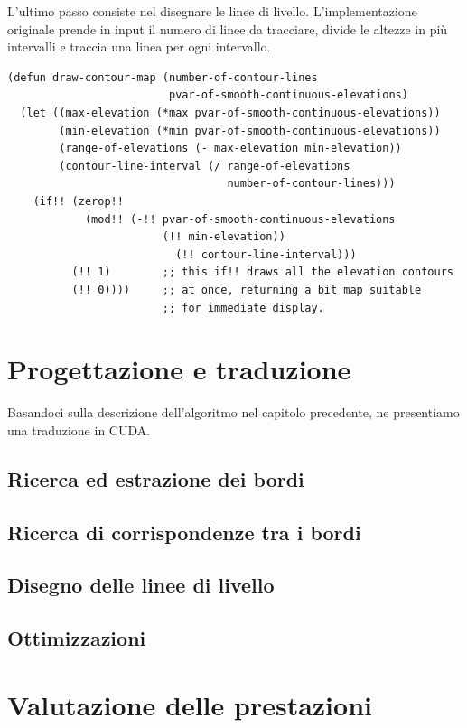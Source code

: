 \documentclass[12pt,a4paper,openright,twoside]{report}
\begin{document}
L'ultimo passo consiste nel disegnare le linee di livello. L'implementazione originale prende in input il numero di linee da tracciare, divide le altezze in più intervalli e traccia una linea per ogni intervallo.

\begin{lstlisting}[style=mystyle]
(defun draw-contour-map (number-of-contour-lines
                         pvar-of-smooth-continuous-elevations)
  (let ((max-elevation (*max pvar-of-smooth-continuous-elevations))
        (min-elevation (*min pvar-of-smooth-continuous-elevations))
        (range-of-elevations (- max-elevation min-elevation))
        (contour-line-interval (/ range-of-elevations
                                  number-of-contour-lines)))
    (if!! (zerop!!
            (mod!! (-!! pvar-of-smooth-continuous-elevations
                        (!! min-elevation))
                          (!! contour-line-interval)))
          (!! 1)        ;; this if!! draws all the elevation contours
          (!! 0))))     ;; at once, returning a bit map suitable
                        ;; for immediate display.
\end{lstlisting}

\chapter{Progettazione e traduzione}

Basandoci sulla descrizione dell'algoritmo nel capitolo precedente, ne presentiamo una traduzione in CUDA.

\section{Ricerca ed estrazione dei bordi}
\section{Ricerca di corrispondenze tra i bordi}
\section{Disegno delle linee di livello}
\section{Ottimizzazioni}



\chapter{Valutazione delle prestazioni}
\end{document}
